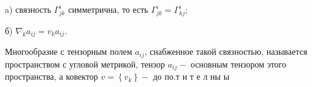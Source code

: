 \documentclass[10pt]{article}
\begin{document}
a) связность $\Gamma_{j k}^{i}$ симметрична, то есть $\Gamma_{j k}^{i}=\Gamma_{k j}^{i}$;



б) $\nabla_{k} a_{i j}=v_{k} a_{i j}$.



Многообразие с тензорным полем $a_{i j}$, снабженное такой связностью, называется пространством с угловой метрикой, тензор $a_{i j}-$ основным тензором этого пространства, а ковектор $v=\left\{v_{k}\right\}-$ до по.т и т е л ны ы
\end{document}
